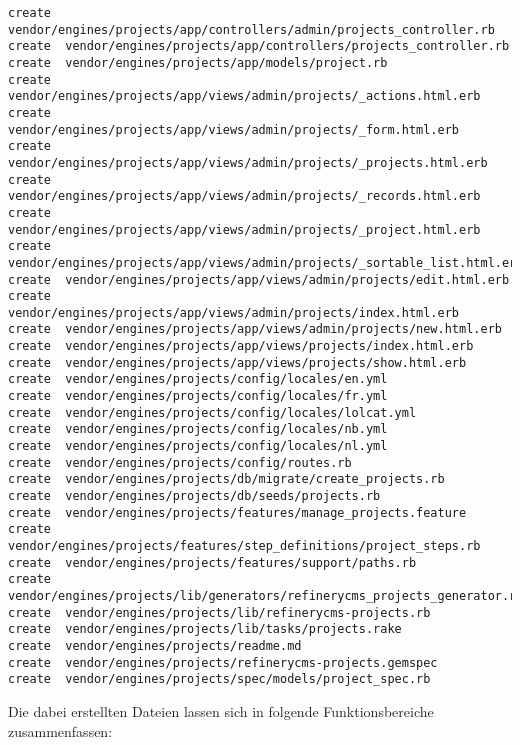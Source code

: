 \begin{lstlisting}[label=sec.refineryoutput,caption=Erzeugte Dateien des Refinery Engine Generators]
create  vendor/engines/projects/app/controllers/admin/projects_controller.rb
create  vendor/engines/projects/app/controllers/projects_controller.rb
create  vendor/engines/projects/app/models/project.rb
create  vendor/engines/projects/app/views/admin/projects/_actions.html.erb
create  vendor/engines/projects/app/views/admin/projects/_form.html.erb
create  vendor/engines/projects/app/views/admin/projects/_projects.html.erb
create  vendor/engines/projects/app/views/admin/projects/_records.html.erb
create  vendor/engines/projects/app/views/admin/projects/_project.html.erb
create  vendor/engines/projects/app/views/admin/projects/_sortable_list.html.erb
create  vendor/engines/projects/app/views/admin/projects/edit.html.erb
create  vendor/engines/projects/app/views/admin/projects/index.html.erb
create  vendor/engines/projects/app/views/admin/projects/new.html.erb
create  vendor/engines/projects/app/views/projects/index.html.erb
create  vendor/engines/projects/app/views/projects/show.html.erb
create  vendor/engines/projects/config/locales/en.yml
create  vendor/engines/projects/config/locales/fr.yml
create  vendor/engines/projects/config/locales/lolcat.yml
create  vendor/engines/projects/config/locales/nb.yml
create  vendor/engines/projects/config/locales/nl.yml
create  vendor/engines/projects/config/routes.rb
create  vendor/engines/projects/db/migrate/create_projects.rb
create  vendor/engines/projects/db/seeds/projects.rb
create  vendor/engines/projects/features/manage_projects.feature
create  vendor/engines/projects/features/step_definitions/project_steps.rb
create  vendor/engines/projects/features/support/paths.rb
create  vendor/engines/projects/lib/generators/refinerycms_projects_generator.rb
create  vendor/engines/projects/lib/refinerycms-projects.rb
create  vendor/engines/projects/lib/tasks/projects.rake
create  vendor/engines/projects/readme.md
create  vendor/engines/projects/refinerycms-projects.gemspec
create  vendor/engines/projects/spec/models/project_spec.rb
\end{lstlisting}


Die dabei erstellten Dateien lassen sich in folgende Funktionsbereiche zusammenfassen:

